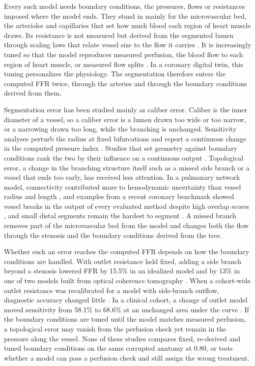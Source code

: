 \documentclass[journal,twoside,web]{ieeecolor}
\begin{document}
Every such model needs boundary conditions, the pressures, flows or resistances imposed where the model ends. They
stand in mainly for the microvascular bed, the arterioles and capillaries that set how much blood each region of heart
muscle draws. Its resistance is not measured but derived from the segmented lumen through
scaling laws that relate vessel size to the flow it carries \cite{murray1926,kim2010}. It is increasingly tuned so that the model reproduces measured perfusion, the blood flow to each region of heart
muscle, or measured flow splits \cite{menon2024,arminio2026}. In a coronary digital twin, this tuning personalizes the physiology. The segmentation therefore enters the computed FFR twice, through the arteries and through the boundary conditions derived from them.

Segmentation error has been studied mainly as caliber error. Caliber is the inner diameter of a vessel, so a caliber error is a lumen drawn too wide or too narrow, or a narrowing drawn too long, while the branching is unchanged. Sensitivity analyses perturb the radius at fixed bifurcations and report a continuous change in the computed pressure index \cite{sankaran2015tmi,sankaran2015cmame,fernandez2024,dalmaso2025}. Studies that set geometry against
boundary conditions rank the two by their influence on a continuous output \cite{sankaran2016,tanade2022,korte2023}. Topological error, a change in the branching structure itself such as a missed side branch or a vessel that ends too early, has received less attention. In a pulmonary network model, connectivity contributed more to hemodynamic uncertainty than vessel radius and
length \cite{colebank2019}, and examples from a recent coronary benchmark showed vessel breaks in the output of every evaluated method despite high overlap scores \cite{bransby2026}, and small distal segments remain the hardest to segment
\cite{chen2025}. A missed branch removes part of the microvascular bed from the model and changes both the flow
through the stenosis and the boundary conditions derived from the tree.

Whether such an error reaches the computed FFR depends on how the boundary conditions are handled. With outlet resistance held fixed, adding a side branch beyond a stenosis lowered FFR by 15.5\% in an idealized model and by 13\% in one of two models built from optical coherence tomography \cite{gamage2022}. When a cohort-wide outlet resistance was recalibrated for a model with side-branch outflow, diagnostic accuracy changed little \cite{gosling2020}. In a clinical cohort, a change of outlet model moved sensitivity from 58.1\% to 68.6\% at an unchanged area under
the curve \cite{fossan2026}. If the boundary conditions are tuned until the model matches measured perfusion, a topological error may vanish
from the perfusion check yet remain in the pressure along the vessel. None of these studies compares fixed, re-derived and tuned boundary conditions on the same corrupted anatomy at
0.80, or tests whether a model can pass a perfusion check and still assign the wrong treatment.
\end{document}
